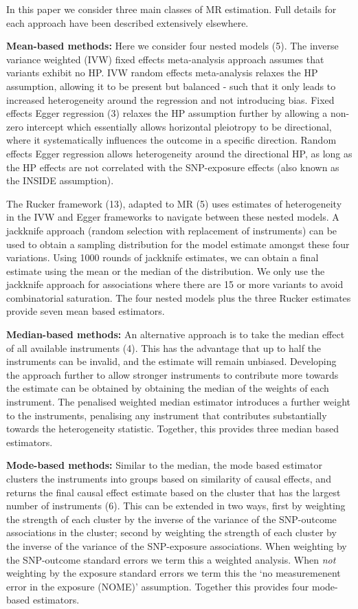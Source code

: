 \documentclass[]{article}
\begin{document}
In this paper we consider three main classes of MR estimation. Full
details for each approach have been described extensively elsewhere.

\textbf{Mean-based methods:} Here we consider four nested models (5).
The inverse variance weighted (IVW) fixed effects meta-analysis approach
assumes that variants exhibit no HP. IVW random effects meta-analysis
relaxes the HP assumption, allowing it to be present but balanced - such
that it only leads to increased heterogeneity around the regression and
not introducing bias. Fixed effects Egger regression (3) relaxes the HP
assumption further by allowing a non-zero intercept which essentially
allows horizontal pleiotropy to be directional, where it systematically
influences the outcome in a specific direction. Random effects Egger
regression allows heterogeneity around the directional HP, as long as
the HP effects are not correlated with the SNP-exposure effects (also
known as the INSIDE assumption).

The Rucker framework (13), adapted to MR (5) uses estimates of
heterogeneity in the IVW and Egger frameworks to navigate between these
nested models. A jackknife approach (random selection with replacement
of instruments) can be used to obtain a sampling distribution for the
model estimate amongst these four variations. Using 1000 rounds of
jackknife estimates, we can obtain a final estimate using the mean or
the median of the distribution. We only use the jackknife approach for
associations where there are 15 or more variants to avoid combinatorial
saturation. The four nested models plus the three Rucker estimates
provide seven mean based estimators.

\textbf{Median-based methods:} An alternative approach is to take the
median effect of all available instruments (4). This has the advantage
that up to half the instruments can be invalid, and the estimate will
remain unbiased. Developing the approach further to allow stronger
instruments to contribute more towards the estimate can be obtained by
obtaining the median of the weights of each instrument. The penalised
weighted median estimator introduces a further weight to the
instruments, penalising any instrument that contributes substantially
towards the heterogeneity statistic. Together, this provides three
median based estimators.

\textbf{Mode-based methods:} Similar to the median, the mode based
estimator clusters the instruments into groups based on similarity of
causal effects, and returns the final causal effect estimate based on
the cluster that has the largest number of instruments (6). This can be
extended in two ways, first by weighting the strength of each cluster by
the inverse of the variance of the SNP-outcome associations in the
cluster; second by weighting the strength of each cluster by the inverse
of the variance of the SNP-exposure associations. When weighting by the
SNP-outcome standard errors we term this a weighted analysis. When
\emph{not} weighting by the exposure standard errors we term this the
`no measuremenent error in the exposure (NOME)' assumption. Together
this provides four mode-based estimators.
\end{document}
